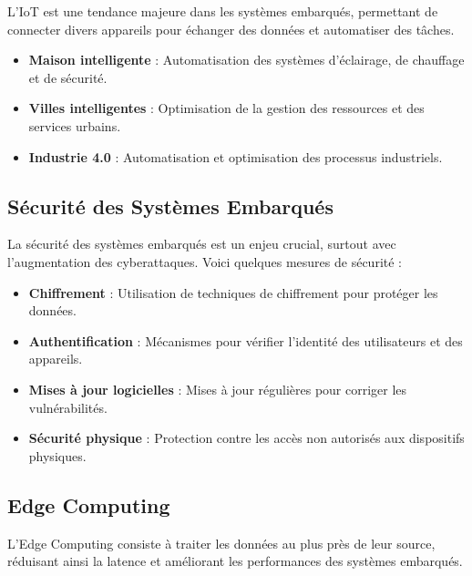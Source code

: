 \documentclass[10pt,a4paper]{article}
\begin{document}
L'IoT est une tendance majeure dans les systèmes embarqués, permettant de connecter divers appareils pour échanger des données et automatiser des tâches.

\begin{itemize}
    \item \textbf{Maison intelligente} : Automatisation des systèmes d'éclairage, de chauffage et de sécurité.
    \item \textbf{Villes intelligentes} : Optimisation de la gestion des ressources et des services urbains.
    \item \textbf{Industrie 4.0} : Automatisation et optimisation des processus industriels.
\end{itemize}


\subsection*{Sécurité des Systèmes Embarqués}

La sécurité des systèmes embarqués est un enjeu crucial, surtout avec l'augmentation des cyberattaques. Voici quelques mesures de sécurité :

\begin{itemize}
    \item \textbf{Chiffrement} : Utilisation de techniques de chiffrement pour protéger les données.
    \item \textbf{Authentification} : Mécanismes pour vérifier l'identité des utilisateurs et des appareils.
    \item \textbf{Mises à jour logicielles} : Mises à jour régulières pour corriger les vulnérabilités.
    \item \textbf{Sécurité physique} : Protection contre les accès non autorisés aux dispositifs physiques.
\end{itemize}


\subsection*{Edge Computing}

L'Edge Computing consiste à traiter les données au plus près de leur source, réduisant ainsi la latence et améliorant les performances des systèmes embarqués.
\end{document}
